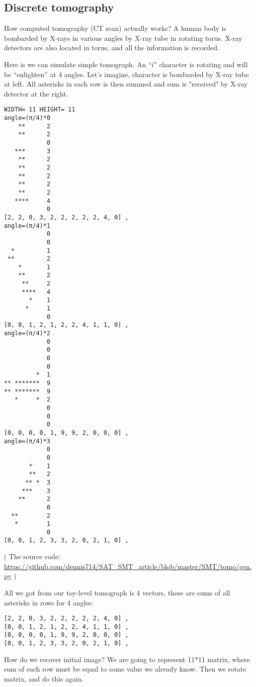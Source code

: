 \subsection{Discrete tomography}

How computed tomography (CT scan) actually works?
A human body is bombarded by X-rays in various angles by X-ray tube in rotating torus.
X-ray detectors are also located in torus, and all the information is recorded.

Here is we can simulate simple tomograph.
An ``i'' character is rotating and will be ``enlighten'' at 4 angles.
Let's imagine, character is bombarded by X-ray tube at left.
All asterisks in each row is then summed and sum is "received" by X-ray detector at the right.

\begin{lstlisting}
WIDTH= 11 HEIGHT= 11
angle=(π/4)*0
    **      2
    **      2
            0
   ***      3
    **      2
    **      2
    **      2
    **      2
    **      2
   ****     4
            0
[2, 2, 0, 3, 2, 2, 2, 2, 2, 4, 0] ,
angle=(π/4)*1
            0
            0
  *         1
 **         2
    *       1
    **      2
     **     2
     ****   4
       *    1
      *     1
            0
[0, 0, 1, 2, 1, 2, 2, 4, 1, 1, 0] ,
angle=(π/4)*2
            0
            0
            0
            0
         *  1
** *******  9
** *******  9
   *     *  2
            0
            0
            0
[0, 0, 0, 0, 1, 9, 9, 2, 0, 0, 0] ,
angle=(π/4)*3
            0
            0
       *    1
       **   2
      ** *  3
     ***    3
    **      2
            0
  **        2
   *        1
            0
[0, 0, 1, 2, 3, 3, 2, 0, 2, 1, 0] ,
\end{lstlisting}

( The source code: \url{https://github.com/dennis714/SAT_SMT_article/blob/master/SMT/tomo/gen.py} )

All we got from our toy-level tomograph is 4 vectors, these are sums of all asterisks in rows for 4 angles:

\begin{lstlisting}
[2, 2, 0, 3, 2, 2, 2, 2, 2, 4, 0] ,
[0, 0, 1, 2, 1, 2, 2, 4, 1, 1, 0] ,
[0, 0, 0, 0, 1, 9, 9, 2, 0, 0, 0] ,
[0, 0, 1, 2, 3, 3, 2, 0, 2, 1, 0] ,
\end{lstlisting}

How do we recover initial image?
We are going to represent 11*11 matrix, where sum of each row must be equal to some value we already know.
Then we rotate matrix, and do this again.

